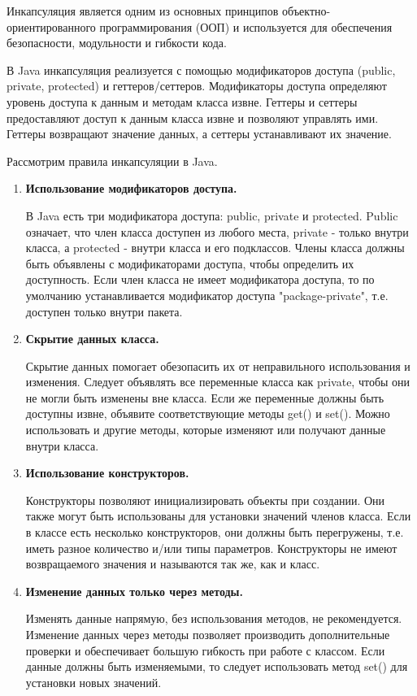 \documentclass[12pt, a4paper]{book}%
\begin{document}
{Инкапсуляция является одним из основных принципов объектно-ориентированного программирования (ООП) и используется для обеспечения безопасности, модульности и гибкости кода.

В Java инкапсуляция реализуется с помощью модификаторов доступа (public, private, protected) и геттеров/сеттеров. Модификаторы доступа определяют уровень доступа к данным и методам класса извне. Геттеры и сеттеры предоставляют доступ к данным класса извне и позволяют управлять ими. Геттеры возвращают значение данных, а сеттеры устанавливают их значение.

Рассмотрим правила инкапсуляции в Java.
\begin{enumerate}
\item {\bf Использование модификаторов доступа.}

В Java есть три модификатора доступа: public, private и protected. Public означает, что член класса доступен из любого места, private - только внутри класса, а protected - внутри класса и его подклассов. Члены класса должны быть объявлены с модификаторами доступа, чтобы определить их доступность. Если член класса не имеет модификатора доступа, то по умолчанию устанавливается модификатор доступа "package-private", т.е. доступен только внутри пакета.

\item {\bf Скрытие данных класса.}

Скрытие данных помогает обезопасить их от неправильного использования и изменения. Следует объявлять все переменные класса как private, чтобы они не могли быть изменены вне класса. Если же переменные должны быть доступны извне, объявите соответствующие методы get() и set(). Можно использовать и другие методы, которые изменяют или получают данные внутри класса. 

\item {\bf Использование конструкторов.}

Конструкторы позволяют инициализировать объекты при создании. Они также могут быть использованы для установки значений членов класса. Если в классе есть несколько конструкторов, они должны быть перегружены, т.е. иметь разное количество и/или типы параметров. Конструкторы не имеют возвращаемого значения и называются так же, как и класс.

\item {\bf Изменение данных только через методы.}

Изменять данные напрямую, без использования методов, не рекомендуется. Изменение данных через методы позволяет производить дополнительные проверки и обеспечивает большую гибкость при работе с классом. Если данные должны быть изменяемыми, то следует использовать метод set() для установки новых значений.


\end{enumerate}}
\end{document}
